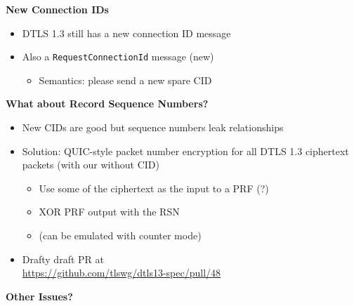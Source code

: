 \documentclass[helvetica]{seminar}
\newcommand{\heading}[1]{%
  \begin{center} 
    \large\bf 
    #1 
  \end{center} 
  \vspace{.4 in}}
\begin{document}
\begin{slide}
  \heading{New Connection IDs}

  \begin{itemize}
  \item DTLS 1.3 still has a new connection ID message
  \item Also a \verb^RequestConnectionId^ message (new)
    \begin{itemize}
    \item Semantics: please send a new spare CID
    \end{itemize}
    
  \end{itemize}

\end{slide}

\begin{slide}
  \heading{What about Record Sequence Numbers?}

  \begin{itemize}
  \item New CIDs are good but sequence numbers leak relationships
  \item Solution: QUIC-style packet number encryption for all DTLS 1.3 ciphertext packets (with our without CID)
    \begin{itemize}
    \item Use some of the ciphertext as the input to a PRF (?)
    \item XOR PRF output with the RSN
    \item (can be emulated with counter mode)      
    \end{itemize}
  \item Drafty draft PR at\\ {\small \url{https://github.com/tlswg/dtls13-spec/pull/48}}
  \end{itemize}
\end{slide}

\begin{slide}
\heading{Other Issues?}

\end{slide}
\end{document}
